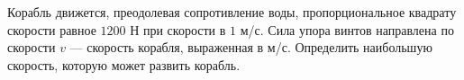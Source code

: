 Корабль движется, преодолевая сопротивление воды,
пропорциональное квадрату скорости равное $1200$ Н при скорости в $1$
м/с. Сила упора винтов направлена по скорости $v$ --- скорость корабля,
выраженная в м/с. Определить наибольшую скорость, которую может развить
корабль.
